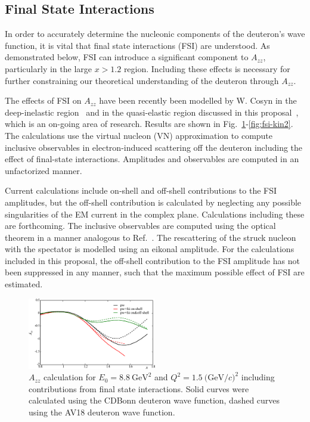 
\subsection{Final State Interactions}

In order to accurately determine the nucleonic components of the deuteron's wave function, it is vital that final state interactions (FSI) are understood. As demonstrated below, FSI can introduce a significant component to $A_{zz}$, particularly in the large $x>1.2$ region. Including these effects is necessary for further constraining our theoretical understanding of the deuteron through $A_{zz}$.

The effects of FSI on $A_{zz}$ have been recently been modelled by W. Cosyn in the deep-inelastic region~\cite{Cosyn:2014sqa} and in the quasi-elastic region discussed in this proposal~\cite{cosyn-convo}, which is an on-going area of research. Results are shown in Fig.~\ref{fig:fsi-kin1}-\ref{fig:fsi-kin2}. The calculations use the virtual nucleon (VN) approximation to compute inclusive observables in electron-induced scattering off the deuteron including the 
effect of final-state interactions. Amplitudes and observables are computed in an unfactorized manner.   

Current calculations include on-shell and off-shell contributions to the FSI amplitudes, but the off-shell contribution is calculated 	by neglecting any  possible singularities of the EM current in the complex plane.  Calculations 
including these are forthcoming.  The inclusive observables are computed using 
the optical theorem in a manner analogous to Ref.~\cite{Cosyn:2013uoa}.  The 
rescattering of the struck nucleon with the spectator is modelled using an 
eikonal amplitude.  For the calculations included in this proposal, the off-shell 
contribution to the FSI amplitude has not been suppressed in any manner, such that the maximum possible effect of FSI are estimated.

\begin{figure}[htb]
\begin{center}
  \includegraphics[width=0.5\textwidth]{figs/kin1_cdbonn_av18.eps}
\caption{$A_{zz}$ calculation for $E_0=8.8\mathrm{~GeV}^2$ and $Q^2=1.5\mathrm{~(GeV/}c)^2$ including contributions from final state interactions.  
Solid curves were calculated using the CDBonn deuteron wave function, dashed curves using the AV18 
deuteron wave function.}
\label{fig:fsi-kin1}       %
\end{center}
\end{figure}

